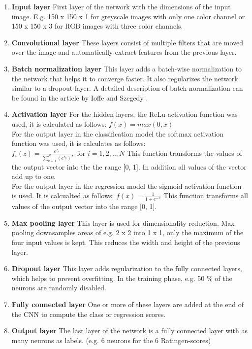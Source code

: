 \documentclass[12pt]{article}
\begin{document}
\begin{enumerate}[label=(\alph*)]
\item \textbf{Input layer} First layer of the network with the dimensions of the input image. E.g.  150 x 150 x 1 for greyscale images with only one color channel or 150 x 150 x 3 for RGB images with three color channels.
\item \textbf{Convolutional layer} These layers consist of multiple filters that are moved over the image and automatically extract features from the previous layer.
\item \textbf{Batch normalization layer} This layer adds a batch-wise normalization to the network that helps it to converge faster. It also regularizes the network similar to a dropout layer. A detailed description of batch normalization can be found in the article by Ioffe and Szegedy \cite{ioffe_2015}.
\item \textbf{Activation layer} For the hidden layers, the ReLu activation function was used, it is calculated as follows: $f(x) = max(0, x)$\\ For the output layer in the classification model the softmax activation function was used, it is calculates as follows: $f_i(z) = \frac{e^{z_i}}{\sum^{N}_{k=1} (e^{z_k})}, \text{	    for    } i = 1, 2, .., N$ \cite{softmax} This function transforms the values of the output vector into the the range [0, 1]. In addition all values of the vector add up to one. \\ For the output layer in the regression model the sigmoid activation function is used. It is calcualted as follows: $f(x) = \frac{1}{1 + e^{-x}}$ \cite{sigmoid} This function transforms all values of the output vector into the range [0, 1].
\item \textbf{Max pooling layer} This layer is used for dimensionality reduction. Max pooling downsamples areas of e.g. 2 x 2 into 1 x 1, only the maximum of the four input values is kept. This reduces the width and height of the previous layer.
\item \textbf{Dropout layer} This layer adds regularization to the fully connected layers, which helps to prevent overfitting. In the training phase, e.g. 50 \% of the neurons are randomly disabled.
\item \textbf{Fully connected layer} One or more of these layers are added at the end of the CNN to compute the class or regression scores.
\item \textbf{Output layer} The last layer of the network is a fully connected layer with as many neurons as labels. (e.g. 6 neurons for the 6 Ratingen-scores)
\end{enumerate}
\end{document}
